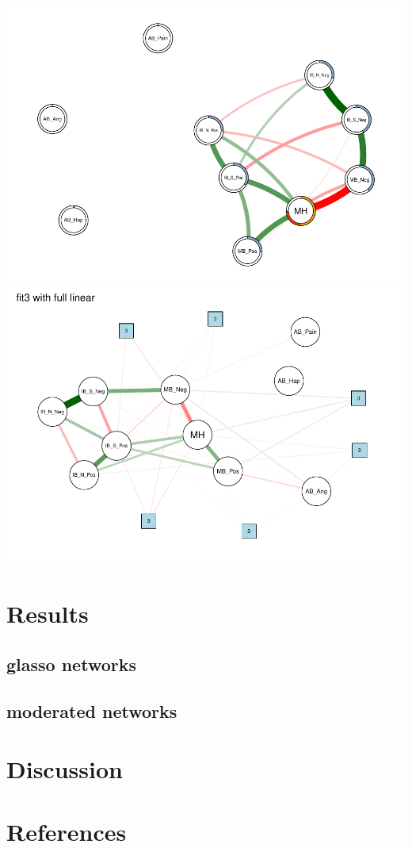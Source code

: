 \documentclass[man,floatsintext]{apa6}
\begin{document}
\includegraphics{script_files/figure-latex/unnamed-chunk-2-1.pdf}
\includegraphics{script_files/figure-latex/unnamed-chunk-2-2.pdf}

\section{Results}\label{results}

\subsection{glasso networks}\label{glasso-networks}

\subsection{moderated networks}\label{moderated-networks}

\section{Discussion}\label{discussion}

\newpage

\section{References}\label{references}

\begingroup
\setlength{\parindent}{-0.5in} \setlength{\leftskip}{0.5in}

\hypertarget{refs}{}

\endgroup
\end{document}
